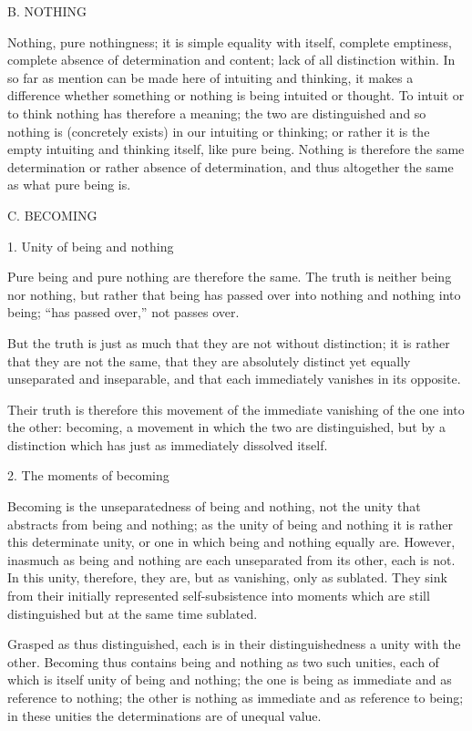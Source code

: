 B. NOTHING

Nothing, pure nothingness;
it is simple equality with itself,
complete emptiness,
complete absence of determination and content;
lack of all distinction within.
In so far as mention can be made here of
intuiting and thinking,
it makes a difference whether something or nothing is
being intuited or thought.
To intuit or to think nothing has therefore a meaning;
the two are distinguished and so nothing is (concretely exists)
in our intuiting or thinking;
or rather it is the empty intuiting and thinking itself,
like pure being.
Nothing is therefore the same determination
or rather absence of determination,
and thus altogether the same as what pure being is.

C. BECOMING

1. Unity of being and nothing

Pure being and pure nothing are therefore the same.
The truth is neither being nor nothing,
but rather that being has passed over into nothing
and nothing into being;
“has passed over,” not passes over.

But the truth is just as much that
they are not without distinction;
it is rather that they are not the same,
that they are absolutely distinct
yet equally unseparated and inseparable,
and that each immediately vanishes in its opposite.

Their truth is therefore this movement of
the immediate vanishing of the one into the other:
becoming, a movement in which the two are distinguished,
but by a distinction which has just as immediately dissolved itself.

2. The moments of becoming

Becoming is the unseparatedness of being and nothing,
not the unity that abstracts from being and nothing;
as the unity of being and nothing
it is rather this determinate unity,
or one in which being and nothing equally are.
However, inasmuch as being and nothing are
each unseparated from its other, each is not.
In this unity, therefore, they are,
but as vanishing, only as sublated.
They sink from their initially represented self-subsistence
into moments which are still distinguished
but at the same time sublated.

Grasped as thus distinguished,
each is in their distinguishedness
a unity with the other.
Becoming thus contains being and nothing as two such unities,
each of which is itself unity of being and nothing;
the one is being as immediate and as reference to nothing;
the other is nothing as immediate and as reference to being;
in these unities the determinations are of unequal value.

